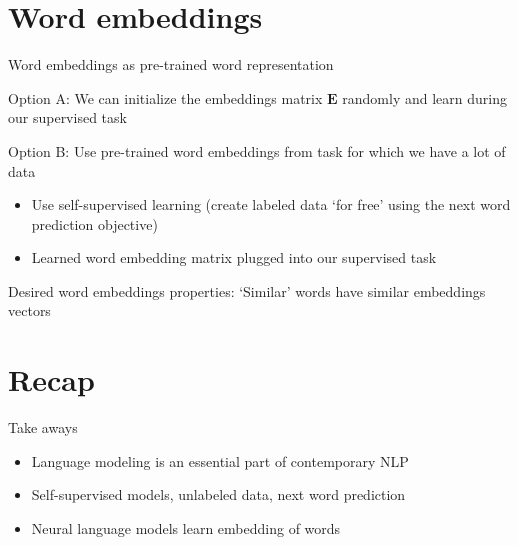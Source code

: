 \documentclass[12pt,aspectratio=169,handout]{beamer}
\begin{document}
\section{Word embeddings}

\begin{frame}{Word embeddings as pre-trained word representation}
	
	Option A: We can initialize the embeddings matrix $\bm{E}$ randomly and learn during our supervised task
	
	Option B: Use pre-trained word embeddings from task for which we have a lot of data
	
	\begin{itemize}
		\item Use self-supervised learning (create labeled data `for free' using the next word prediction objective)
		\item Learned word embedding matrix plugged into our supervised task
	\end{itemize}
	
	Desired word embeddings properties: `Similar' words have similar embeddings vectors
\end{frame}


\section*{Recap}






\begin{frame}{Take aways}
	
	\begin{itemize}
		\item Language modeling is an essential part of contemporary NLP
		\item Self-supervised models, unlabeled data, next word prediction
		\item Neural language models learn embedding of words
	\end{itemize}
	
\end{frame}
\end{document}
